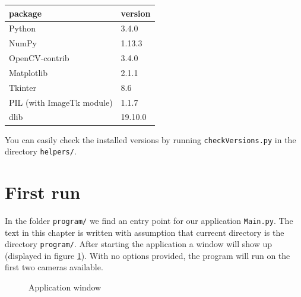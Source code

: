 \begin{center}
\begin{tabular}{l l}
	package	&	version 	\\ \hline
	Python	&	3.4.0 		\\
	NumPy	&	1.13.3 		\\
	OpenCV-contrib	&	3.4.0 	\\ 
	Matplotlib &	2.1.1 		\\
	Tkinter	&	8.6 		\\
	PIL (with ImageTk module)	&	1.1.7 		\\
	dlib	&	19.10.0
\end{tabular}
\end{center}

You can easily check the installed versions by running \verb+checkVersions.py+ in
the directory \verb+helpers/+.

\section{First run}

In the folder \verb+program/+ we find an entry point for our application
\verb+Main.py+. The text in this chapter is written with assumption that
currecnt directory is the directory \verb+program/+. After starting the
application a window will show up (displayed in figure \ref{fig:application}).
With no options provided, the program will run on the first two cameras
available.

\begin{figure}
	\caption{Application window}
	\label{fig:application}
\end{figure}


